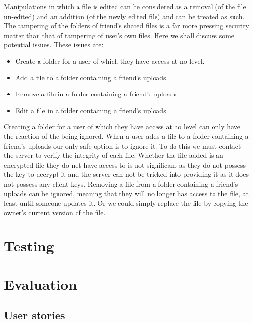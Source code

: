 \documentclass[12pt, titlepage]{article}
\begin{document}
\newline \indent Manipulations in which a file is edited can be considered as a removal (of the file un-edited) and an addition (of the newly edited file) and can be treated as such.
\newline
\newline \indent The tampering of the folders of friend's shared files is a far more pressing security matter than that of tampering of user's own files. Here we shall discuss some potential issues. These issues are:
\begin{itemize}
	\item Create a folder for a user of which they have access at no level.
	\item Add a file to a folder containing a friend's uploads
	\item Remove a file in a folder containing a friend's uploads
	\item Edit a file in a folder containing a friend's uploads
\end{itemize}
Creating a folder for a user of which they have access at no level can only have the reaction of the being ignored.
\newline \indent When a user adds a file to a folder containing a friend's uploads our only safe option is to ignore it. To do this we must contact the server to verify the integrity of each file. Whether the file added is an encrypted file they do not have access to is not significant as they do not possess the key to decrypt it and the server can not be tricked into providing it as it does not possess any client keys.
\newline \indent Removing a file from a folder containing a friend's uploads can be ignored, meaning that they will no longer has access to the file, at least until someone updates it. Or we could simply replace the file by copying the owner's current version of the file.

\section{Testing}




\section{Evaluation}

\subsection{User stories}
\end{document}

